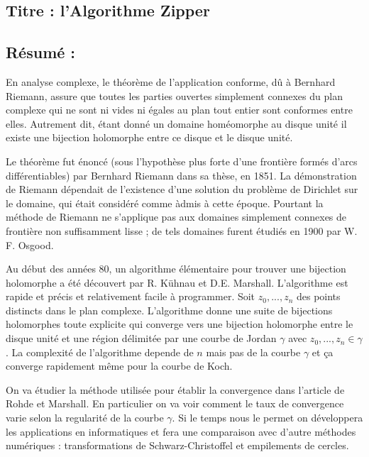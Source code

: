 \documentclass[
]{article}
\author{}
\date{}
\begin{document}
\hypertarget{titre-lalgorithme-zipper}{%
\subsection{Titre : l'Algorithme
Zipper}\label{titre-lalgorithme-zipper}}

\hypertarget{ruxe9sumuxe9}{%
\subsection{Résumé :}\label{ruxe9sumuxe9}}

En analyse complexe, le théorème de l'application conforme, dû à
Bernhard Riemann, assure que toutes les parties ouvertes simplement
connexes du plan complexe qui ne sont ni vides ni égales au plan tout
entier sont conformes entre elles. Autrement dit, étant donné un domaine
homéomorphe au disque unité il existe une bijection holomorphe entre ce
disque et le disque unité.

Le théorème fut énoncé (sous l'hypothèse plus forte d'une frontière
formés d'arcs différentiables) par Bernhard Riemann dans sa thèse, en
1851. La démonstration de Riemann dépendait de l'existence d'une
solution du problème de Dirichlet sur le domaine, qui était considéré
comme àdmis à cette époque. Pourtant la méthode de Riemann ne s'applique
pas aux domaines simplement connexes de frontière non suffisamment lisse
; de tels domaines furent étudiés en 1900 par W. F. Osgood.

Au début des années 80, un algorithme élémentaire pour trouver une
bijection holomorphe a été découvert par R. Kühnau et D.E. Marshall.
L'algorithme est rapide et précis et relativement facile à programmer.
Soit \(z_0, ..., z_n\) des points distincts dans le plan complexe.
L'algorithme donne une suite de bijections holomorphes toute explicite
qui converge vers une bijection holomorphe entre le disque unité et une
région délimitée par une courbe de Jordan \(\gamma\) avec
\(z_0, ..., z_n \in \gamma\). La complexité de l'algorithme depende de
\(n\) mais pas de la courbe \(\gamma\) et ça converge rapidement même
pour la courbe de Koch.

On va étudier la méthode utilisée pour établir la convergence dans
l'article de Rohde et Marshall. En particulier on va voir comment le
taux de convergence varie selon la regularité de la courbe \(\gamma\).
Si le temps nous le permet on développera les applications en
informatiques et fera une comparaison avec d'autre méthodes numériques :
transformations de Schwarz-Christoffel et empilements de cercles.
\end{document}
